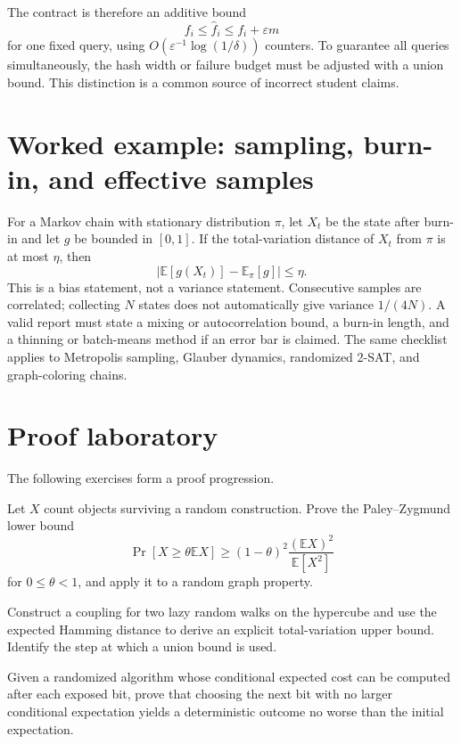 The contract is therefore an additive bound
\[
 f_i\leq\widehat f_i\leq f_i+\varepsilon m
\]
for one fixed query, using $O(\varepsilon^{-1}\log(1/\delta))$ counters.
To guarantee all queries simultaneously, the hash width or failure budget
must be adjusted with a union bound.  This distinction is a common source of
incorrect student claims.

\section{Worked example: sampling, burn-in, and effective samples}

For a Markov chain with stationary distribution $\pi$, let $X_t$ be the state
after burn-in and let $g$ be bounded in $[0,1]$.  If the total-variation
distance of $X_t$ from $\pi$ is at most $\eta$, then
\[
 |\mathbb E[g(X_t)]-\mathbb E_\pi[g]|\leq\eta.
\]
This is a bias statement, not a variance statement.  Consecutive samples are
correlated; collecting $N$ states does not automatically give variance
$1/(4N)$.  A valid report must state a mixing or autocorrelation bound, a
burn-in length, and a thinning or batch-means method if an error bar is
claimed.  The same checklist applies to Metropolis sampling, Glauber dynamics,
randomized 2-SAT, and graph-coloring chains.

\section{Proof laboratory}

The following exercises form a proof progression.

\begin{problem}
Let $X$ count objects surviving a random construction.  Prove the
Paley--Zygmund lower bound
\[
 \Pr[X\geq\theta\mathbb EX]\geq
 (1-\theta)^2\frac{(\mathbb EX)^2}{\mathbb E[X^2]}
\]
for $0\leq\theta<1$, and apply it to a random graph property.
\end{problem}

\begin{problem}[Coupling]
Construct a coupling for two lazy random walks on the hypercube and use the
expected Hamming distance to derive an explicit total-variation upper bound.
Identify the step at which a union bound is used.
\end{problem}

\begin{problem}[Derandomization]
Given a randomized algorithm whose conditional expected cost can be computed
after each exposed bit, prove that choosing the next bit with no larger
conditional expectation yields a deterministic outcome no worse than the
initial expectation.
\end{problem}


